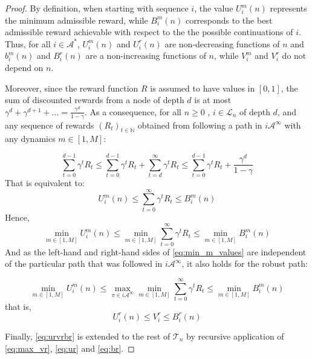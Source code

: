 \documentclass{article}
\begin{document}
\begin{proof}
	By definition, when starting with sequence $i$, the value $U_i^m(n)$ represents the minimum admissible reward, while $B_i^m(n)$ corresponds to the best admissible reward achievable with respect to the the possible continuations of $i$. Thus, for all $i\in\mathcal{A}^*$, $U_i^m(n)$ and $U_i^r(n)$ are non-decreasing functions of $n$ and $b_i^m(n)$ and $B_i^r(n)$ are a non-increasing functions of $n$, while $V_i^m$ and $V_i^r$ do not depend on $n$.
	
	Moreover, since the reward function $R$ is assumed to have values in $[0, 1]$, the sum of discounted rewards from a node of depth $d$ is at most $\gamma^d + \gamma^{d+1}+\dots = \frac{\gamma^d}{1-\gamma}$. As a consequence, for all $n \geq 0$ , $i\in\mathcal{L}_n$ of depth $d$, and any sequence of rewards $(R_t)_{t\in\mathbb{N}}$ obtained from following a path in $i\mathcal{A}^\infty$ with any dynamics $m \in [1, M]$:
	
	\begin{equation*}
	\sum_{t=0}^{d-1} \gamma^t R_t \leq \sum_{t=0}^{d-1} \gamma^t R_t + \sum_{t=d}^\infty \gamma^t R_t \leq \sum_{t=0}^{d-1} \gamma^t R_t + \frac{\gamma^d}{1-\gamma}
	\end{equation*}
	That is equivalent to:
	\begin{equation*}
	U^m_i(n) \leq \sum_{t=0}^\infty \gamma^t R_t \leq B^m_i(n) 
	\end{equation*}
	Hence,
	\begin{equation}
	\label{eq:min_m_values}
	\min_{m \in [1, M]} U^m_i(n) \leq \min_{m \in [1, M]} \sum_{t=0}^\infty \gamma^t R_t \leq \min_{m \in [1, M]} B^m_i(n)
	\end{equation}
	And as the left-hand and right-hand sides of \eqref{eq:min_m_values} are independent of the particular path that was followed in $i\mathcal{A}^\infty$, it also holds for the robust path:
	
	\begin{equation*}
	\min_{m \in [1, M]} U^m_i(n) \leq \max_{\pi\in i\mathcal{A}^\infty} \min_{m \in [1, M]} \sum_{t=0}^\infty \gamma^t R_t \leq \min_{m \in [1, M]} B^m_i(n)
	\end{equation*}
	that is,
	\begin{equation}
	\label{eq:urvrbr}
	U^r_i(n) \leq V^r_i  \leq B^r_i(n)
	\end{equation}
	
	Finally, \eqref{eq:urvrbr} is extended to the rest of $\mathcal{T}_n$ by recursive application of \eqref{eq:max_vr}, \eqref{eq:ur} and \eqref{eq:br}.
\end{proof}
\end{document}
